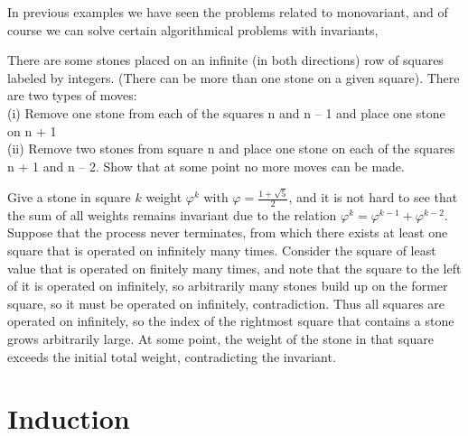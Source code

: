 In previous examples we have seen the problems related to monovariant, and of course we can solve certain algorithmical problems with invariants,


\begin{example}
There are some stones placed on an infinite (in both
directions) row of squares labeled by integers. (There can be
more than one stone on a given square). There are two types
of moves:
\\
(i) Remove one stone from each of the squares n and n – 1
and place one stone on n + 1
\\
(ii) Remove two stones from square n and place one stone on
each of the squares n + 1 and n – 2.  
Show that at some point no more moves can be made.
\end{example}
\sol
Give a stone in square $k$ weight $\varphi^k$ with $\varphi= \frac{1+\sqrt{5}}{2}$, and it is not hard to see that the sum of all weights remains invariant due to the relation $\varphi^k = \varphi^{k-1} + \varphi^{k-2}$. Suppose that the process never terminates, from which there exists at least one square that is operated on infinitely many times. Consider the square of least value that is operated on finitely many times, and note that the square to the left of it is operated on infinitely, so arbitrarily many stones build up on the former square, so it must be operated on infinitely, contradiction. Thus all squares are operated on infinitely, so the index of the rightmost square that contains a stone grows arbitrarily large. At some point, the weight of the stone in that square exceeds the initial total weight, contradicting the invariant.
\begin{example}


\end{example}

\section{Induction}
\begin{example}
\end{example}
